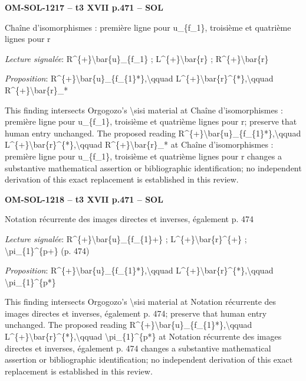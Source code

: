 \par\noindent\textbf{OM-SOL-1217 -- t3 XVII p.471 -- SOL}\par
Chaîne d'isomorphismes : première ligne pour u\_\{f\_1\}, troisième et quatrième lignes pour r\par
\emph{Lecture signalée}: R\textasciicircum{}\{+\}\textbackslash{}bar\{u\}\_\{f\_1\} ; L\textasciicircum{}\{+\}\textbackslash{}bar\{r\} ; R\textasciicircum{}\{+\}\textbackslash{}bar\{r\}\par
\emph{Proposition}: R\textasciicircum{}\{+\}\textbackslash{}bar\{u\}\_\{f\_\{1\}*\},\textbackslash{}qquad L\textasciicircum{}\{+\}\textbackslash{}bar\{r\}\textasciicircum{}\{*\},\textbackslash{}qquad R\textasciicircum{}\{+\}\textbackslash{}bar\{r\}\_*\par
This finding intersects Orgogozo's \textbackslash{}sisi material at Chaîne d'isomorphismes : première ligne pour u\_\{f\_1\}, troisième et quatrième lignes pour r; preserve that human entry unchanged. The proposed reading R\textasciicircum{}\{+\}\textbackslash{}bar\{u\}\_\{f\_\{1\}*\},\textbackslash{}qquad L\textasciicircum{}\{+\}\textbackslash{}bar\{r\}\textasciicircum{}\{*\},\textbackslash{}qquad R\textasciicircum{}\{+\}\textbackslash{}bar\{r\}\_* at Chaîne d'isomorphismes : première ligne pour u\_\{f\_1\}, troisième et quatrième lignes pour r changes a substantive mathematical assertion or bibliographic identification; no independent derivation of this exact replacement is established in this review.\par
\par\noindent\textbf{OM-SOL-1218 -- t3 XVII p.471 -- SOL}\par
Notation récurrente des images directes et inverses, également p. 474\par
\emph{Lecture signalée}: R\textasciicircum{}\{+\}\textbackslash{}bar\{u\}\_\{f\_\{1\}+\} ; L\textasciicircum{}\{+\}\textbackslash{}bar\{r\}\textasciicircum{}\{+\} ; \textbackslash{}pi\_\{1\}\textasciicircum{}\{p+\} (p. 474)\par
\emph{Proposition}: R\textasciicircum{}\{+\}\textbackslash{}bar\{u\}\_\{f\_\{1\}*\},\textbackslash{}qquad L\textasciicircum{}\{+\}\textbackslash{}bar\{r\}\textasciicircum{}\{*\},\textbackslash{}qquad \textbackslash{}pi\_\{1\}\textasciicircum{}\{p*\}\par
This finding intersects Orgogozo's \textbackslash{}sisi material at Notation récurrente des images directes et inverses, également p. 474; preserve that human entry unchanged. The proposed reading R\textasciicircum{}\{+\}\textbackslash{}bar\{u\}\_\{f\_\{1\}*\},\textbackslash{}qquad L\textasciicircum{}\{+\}\textbackslash{}bar\{r\}\textasciicircum{}\{*\},\textbackslash{}qquad \textbackslash{}pi\_\{1\}\textasciicircum{}\{p*\} at Notation récurrente des images directes et inverses, également p. 474 changes a substantive mathematical assertion or bibliographic identification; no independent derivation of this exact replacement is established in this review.\par
